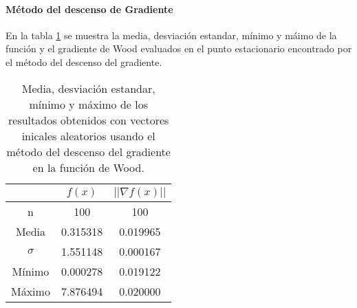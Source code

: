 \paragraph{Método del descenso de Gradiente}

En la tabla \ref{table:wood_4_random_gradient} se muestra la media, desviación estandar, mínimo y máimo de la función y el gradiente de Wood evaluados en el punto estacionario encontrado por el método del descenso del gradiente.

\begin{table}[H]
    \centering
    \begin{tabular}{ccc} \hline
                 & $f(x)$   & $||\nabla f(x)||$ \\ \hline
        n        & 100      & 100               \\
        Media    & 0.315318 & 0.019965          \\
        $\sigma$ & 1.551148 & 0.000167          \\
        Mínimo   & 0.000278 & 0.019122          \\
        Máximo   & 7.876494 & 0.020000          \\ \hline
    \end{tabular}
    \caption{Media, desviación estandar, mínimo y máximo de los resultados obtenidos con vectores inicales aleatorios usando el método del descenso del gradiente en la función de Wood.}
    \label{table:wood_4_random_gradient}
\end{table}
